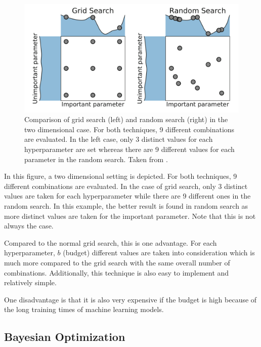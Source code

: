 \begin{figure}[hbtp!]
	\centering
	\includegraphics[scale=0.2]{figures/comparison_searches.png}
	\caption{Comparison of grid search (left) and random search (right) in the two dimensional case. For both techniques, 9 different combinations are evaluated. In the left case, only 3 distinct values for each hyperparameter are set whereas there are 9 different values for each parameter in the random search. Taken from \cite{feurer2019hyperparameter}. }
	\label{fig:comparison_searches}
\end{figure}

In this figure, a two dimensional setting is depicted. For both techniques, 9 different combinations are evaluated. In the case of grid search, only 3 distinct values are taken for each hyperparameter while there are 9 different ones in the random search. In this example, the better result is found in random search as more distinct values are taken for the important parameter. Note that this is not always the case. 

Compared to the normal grid search, this is one advantage. For each hyperparameter, $ b $ (budget) different values are taken into consideration which is much more compared to the grid search with the same overall number of combinations. Additionally, this technique is also easy to implement and relatively simple. 

One disadvantage is that it is also very expensive if the budget is high because of the long training times of machine learning models. 


\subsection{Bayesian Optimization}

